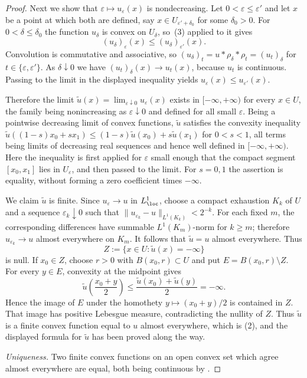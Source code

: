 \begin{proof}
Next we show that $\varepsilon\mapsto u_\varepsilon(x)$ is nondecreasing.
Let $0<\varepsilon\leq\varepsilon'$ and let $x$ be a point at which both are
defined, say $x\in U_{\varepsilon'+\delta_0}$ for some $\delta_0>0$.  For
$0<\delta\leq\delta_0$ the function $u_\delta$ is convex on $U_\delta$, so
\,(3) applied to it gives
\[
 (u_\delta)_{\varepsilon}(x)\leq(u_\delta)_{\varepsilon'}(x).
\]
Convolution is commutative and associative, so
$(u_\delta)_{t}=u*\rho_\delta*\rho_{t}=(u_{t})_\delta$ for $t\in\{\varepsilon,\varepsilon'\}$.
As $\delta\downarrow0$ we have $(u_t)_\delta(x)\to u_t(x)$, because $u_t$ is
continuous.  Passing to the limit in the displayed inequality yields
$u_\varepsilon(x)\leq u_{\varepsilon'}(x)$.

Therefore the limit
$\tilde u(x)=\lim_{\varepsilon\downarrow0}u_\varepsilon(x)$ exists in
$[-\infty,+\infty)$ for every $x\in U$, the family being nonincreasing as
$\varepsilon\downarrow0$ and defined for all small $\varepsilon$.  Being a
pointwise decreasing limit of convex functions, $\tilde u$ satisfies the
convexity inequality
$\tilde u((1-s)x_0+sx_1)\leq(1-s)\tilde u(x_0)+s\tilde u(x_1)$ for
$0<s<1$, all terms
being limits of decreasing real sequences and hence well defined in
$[-\infty,+\infty)$.  Here the inequality is first applied for
$\varepsilon$ small enough that the compact segment $[x_0,x_1]$ lies in
$U_\varepsilon$, and then passed to the limit.  For $s=0,1$ the assertion
is equality, without forming a zero coefficient times $-\infty$.

We claim $\tilde u$ is finite.  Since $u_\varepsilon\to u$ in
$L^1_{\loc}$, choose a compact exhaustion $K_k$ of $U$ and a sequence
$\varepsilon_k\downarrow0$ such that
$\lVert u_{\varepsilon_k}-u\rVert_{L^1(K_k)}<2^{-k}$.  For each fixed $m$,
the corresponding differences have summable $L^1(K_m)$-norm for $k\geq m$;
therefore $u_{\varepsilon_k}\to u$ almost everywhere on $K_m$.  It follows
that $\tilde u=u$ almost everywhere.  Thus
\[
 Z:=\{x\in U:\tilde u(x)=-\infty\}
\]
is null.  If $x_0\in Z$, choose $r>0$ with $B(x_0,r)\subset U$ and put
$E=B(x_0,r)\setminus Z$.  For every $y\in E$, convexity at the midpoint gives
\[
 \tilde u\!\left(\frac{x_0+y}{2}\right)
 \leq\frac{\tilde u(x_0)+\tilde u(y)}2=-\infty.
\]
Hence the image of $E$ under the homothety
$y\mapsto(x_0+y)/2$ is contained in $Z$.  That image has positive Lebesgue
measure, contradicting the nullity of $Z$.  Thus $\tilde u$ is a finite
convex function equal to $u$ almost everywhere, which is (2), and the
displayed formula for $\tilde u$ has been proved along the way.

\emph{Uniqueness.}  Two finite convex functions on an open convex set which
agree almost everywhere are equal, both being continuous by
\cite[\S10]{Roc70}.
\end{proof}

